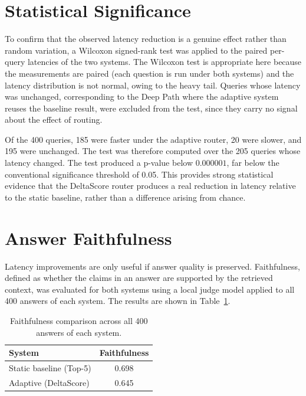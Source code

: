 \documentclass[12pt, a4paper, oneside]{report}
\begin{document}
\section{Statistical Significance}

To confirm that the observed latency reduction is a genuine effect rather than random variation, a Wilcoxon signed-rank test was applied to the paired per-query latencies of the two systems. The Wilcoxon test is appropriate here because the measurements are paired (each question is run under both systems) and the latency distribution is not normal, owing to the heavy tail. Queries whose latency was unchanged, corresponding to the Deep Path where the adaptive system reuses the baseline result, were excluded from the test, since they carry no signal about the effect of routing.

Of the 400 queries, 185 were faster under the adaptive router, 20 were slower, and 195 were unchanged. The test was therefore computed over the 205 queries whose latency changed. The test produced a p-value below $0.000001$, far below the conventional significance threshold of 0.05. This provides strong statistical evidence that the DeltaScore router produces a real reduction in latency relative to the static baseline, rather than a difference arising from chance.

\section{Answer Faithfulness}

Latency improvements are only useful if answer quality is preserved. Faithfulness, defined as whether the claims in an answer are supported by the retrieved context, was evaluated for both systems using a local judge model applied to all 400 answers of each system. The results are shown in Table~\ref{tab:faithfulness}.

\begin{table}[ht]
\centering
\caption{Faithfulness comparison across all 400 answers of each system.}
\label{tab:faithfulness}
\begin{tabular}{@{}lc@{}}
\toprule
\textbf{System} & \textbf{Faithfulness} \\
\midrule
Static baseline (Top-5) & 0.698 \\
Adaptive (DeltaScore)   & 0.645 \\
\bottomrule
\end{tabular}
\end{table}
\end{document}

